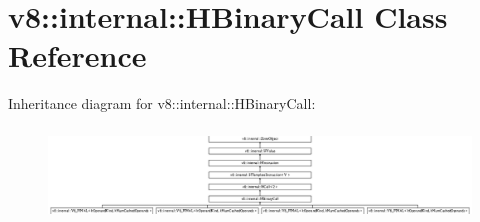 \hypertarget{classv8_1_1internal_1_1_h_binary_call}{}\section{v8\+:\+:internal\+:\+:H\+Binary\+Call Class Reference}
\label{classv8_1_1internal_1_1_h_binary_call}
Inheritance diagram for v8\+:\+:internal\+:\+:H\+Binary\+Call\+:\begin{figure}[H]
\begin{center}
\leavevmode
\includegraphics[height=2.500000cm]{classv8_1_1internal_1_1_h_binary_call}
\end{center}
\end{figure}

